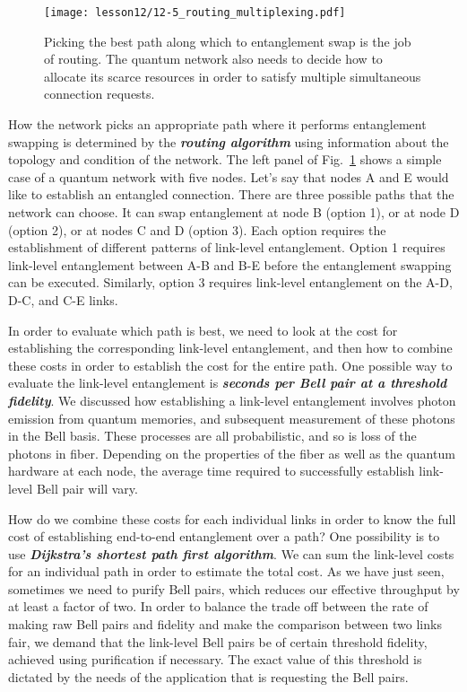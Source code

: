 \begin{figure}[t]
    \centering
    \texttt{[image: lesson12/12-5\_routing\_multiplexing.pdf]}
    \caption[Routing and multiplexing]{Picking the best path along which to entanglement swap is the job of routing. The quantum network also needs to decide how to allocate its scarce resources in order to satisfy multiple simultaneous connection requests.}
    \label{fig:12-5_routing_multiplexing}
\end{figure}

How the network picks an appropriate path where it performs entanglement swapping is determined by the \textit{\textbf{routing algorithm}} using information about the topology and condition of the network.
The left panel of Fig.~\ref{fig:12-5_routing_multiplexing} shows a simple case of a quantum network with five nodes.
Let's say that nodes A and E would like to establish an entangled connection.
There are three possible paths that the network can choose.
It can swap entanglement at node B (option 1), or at node D (option 2), or at nodes C and D (option 3).
Each option requires the establishment of different patterns of link-level entanglement.
Option 1 requires link-level entanglement between A-B and B-E before the entanglement swapping can be executed.
Similarly, option 3 requires link-level entanglement on the A-D, D-C, and C-E links.

In order to evaluate which path is best, we need to look at the cost for establishing the corresponding link-level entanglement, and then how to combine these costs in order to establish the cost for the entire path.
One possible way to evaluate the link-level entanglement is \textit{\textbf{seconds per Bell pair at a threshold fidelity}}.
We discussed how establishing a link-level entanglement involves photon emission from quantum memories, and subsequent measurement of these photons in the Bell basis.
These processes are all probabilistic, and so is loss of the photons in fiber.
Depending on the properties of the fiber as well as the quantum hardware at each node, the average time required to successfully establish link-level Bell pair will vary.

How do we combine these costs for each individual links in order to know the full cost of establishing end-to-end entanglement over a path?
One possibility is to use \textit{\textbf{Dijkstra's shortest path first algorithm}}\label{dijkstra}.
We can sum the link-level costs for an individual path in order to estimate the total cost.  As we have just seen, sometimes we need to purify Bell pairs, which reduces our effective throughput by at least a factor of two. In order to balance the trade off between the rate of making raw Bell pairs and fidelity and make the comparison between two links fair, we demand that the link-level Bell pairs be of certain threshold fidelity, achieved using purification if necessary.
The exact value of this threshold is dictated by the needs of the application that is requesting the Bell pairs.

